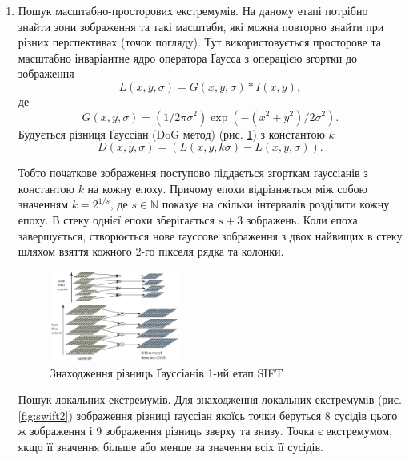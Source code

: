 \begin{enumerate}
    \item Пошук масштабно-просторових екстремумів.
          На даному етапі потрібно знайти зони зображення та такі масштаби, які можна повторно
          знайти при різних перспективах (точок погляду). Тут використовується просторове та
          масштабно інваріантне ядро оператора Ґаусса з операцією згортки
          до зображення
          \begin{equation*}
              L(x,y,\sigma) = G(x,y,\sigma) \ast I(x,y),
          \end{equation*}
          де
          \begin{equation*}
              G(x,y,\sigma) = (1/2\pi\sigma^2)\exp({-(x^2+y^2)/2\sigma^2}).
          \end{equation*}
          Будується різниця Ґауссіан (DoG метод) (рис. \ref{fig:swift1}) з константою $k$
          \begin{equation*}
              D(x,y,\sigma) = (L(x,y,k\sigma) - L(x,y,\sigma)).
          \end{equation*}

          Тобто початкове зображення поступово піддається згорткам ґауссіанів з константою
          $k$ на кожну епоху. Причому епохи відрізняється між собою значенням $k = 2^{1/s}$,
          де $s\in\mathbb{N}$ показує на скільки інтервалів розділити кожну епоху.
          В стеку однієї епохи зберігається $s+3$ зображень. Коли епоха завершується,
          створюється нове ґауссове зображення з двох найвищих в стеку
          шляхом взяття кожного 2-го пікселя рядка та колонки.

          \begin{figure}[H]
              \centering
              \includegraphics[width=0.4\textwidth]{images/sift1}
              \caption{Знаходження різниць Ґауссіанів 1-ий етап SIFT \cite{bib:sift}
                  \label{fig:swift1}
              }
          \end{figure}

          \subitem Пошук локальних екстремумів. Для знаходження локальних екстремумів
          (рис. \ref{fig:swift2}) зображення
          різниці ґауссіан якоїсь точки беруться 8 сусідів цього ж зображення і 9 зображення
          різниць зверху та знизу. Точка є екстремумом, якщо її значення більше або менше за
          значення всіх її сусідів.


\end{enumerate}
